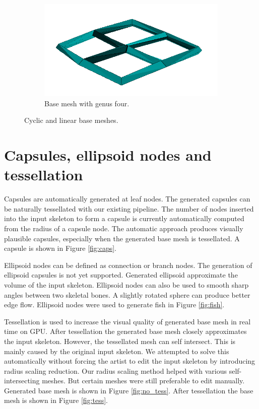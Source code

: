 \begin{figure}[h]
        \begin{subfigure}[b]{0.5\textwidth}
        	\centering
                \includegraphics[width=\textwidth]{images/cycle_mesh.png}
                \caption{Base mesh with genus four.}
                \label{fig:cyclic_mesh}
        \end{subfigure}
        \caption[Cyclic and linear base meshes]{Cyclic and linear base meshes.}\label{fig:pavuk}
\end{figure}

\section{Capsules, ellipsoid nodes and tessellation}

Capsules are automatically generated at leaf nodes.
The generated capsules can be naturally tessellated with our existing pipeline.
The number of nodes inserted into the input skeleton to form a capsule is currently automatically computed from the radius of a capsule node.
The automatic approach produces visually plausible capsules, especially when the generated base mesh is tessellated.
A capsule is shown in Figure \ref{fig:caps}.

Ellipsoid nodes can be defined as connection or branch nodes.
The generation of ellipsoid capsules is not yet supported.
Generated ellipsoid approximate the volume of the input skeleton.
Ellipsoid nodes can also be used to smooth sharp angles between two skeletal bones.
A slightly rotated sphere can produce better edge flow.
Ellipsoid nodes were used to generate fish in Figure \ref{fig:fish}.

Tessellation is used to increase the visual quality of generated base mesh in real time on GPU.
After tessellation the generated base mesh closely approximates the input skeleton.
However, the tessellated mesh can self intersect.
This is mainly caused by the original input skeleton.
We attempted to solve this automatically without forcing the artist to edit the input skeleton by introducing radius scaling reduction.
Our radius scaling method helped with various self-intersecting meshes.
But certain meshes were still preferable to edit manually.
Generated base mesh is shown in Figure \ref{fig:no_tess}.
After tessellation the base mesh is shown in Figure \ref{fig:tess}.

